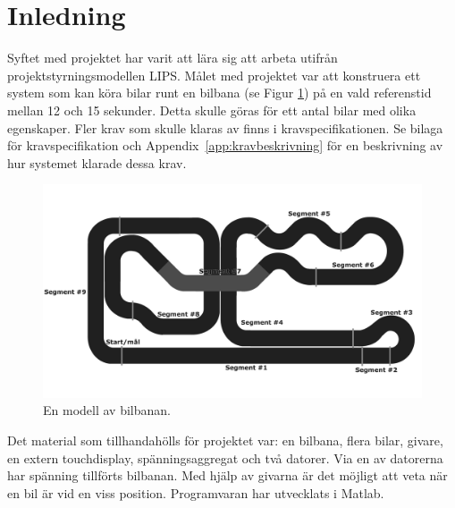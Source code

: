 \section{Inledning}

Syftet med projektet har varit att lära sig att arbeta utifrån
projektstyrningsmodellen LIPS. Målet med projektet var att konstruera ett system
som kan köra bilar runt en bilbana (se Figur \ref{fig:bilbanan}) %
på en vald referenstid mellan 12 och 15
sekunder. Detta skulle göras för ett antal bilar med olika egenskaper. Fler krav
som skulle klaras av finns i kravspecifikationen. Se bilaga för kravspecifikation och Appendix~\ref{app:kravbeskrivning} för en beskrivning av
hur systemet klarade dessa krav.

\begin{figure}
	\centering
	\includegraphics[width=\linewidth] {Figures/BanaModell}
	\caption{En modell av bilbanan.}
	\label{fig:bilbanan}
\end{figure} 

Det material som tillhandahölls för projektet var: en bilbana, flera bilar, givare, en extern touchdisplay, spänningsaggregat och två datorer.
Via en av datorerna har spänning tillförts
bilbanan. Med hjälp av givarna är det möjligt att veta när en bil är vid en viss position. Programvaran har utvecklats i Matlab.